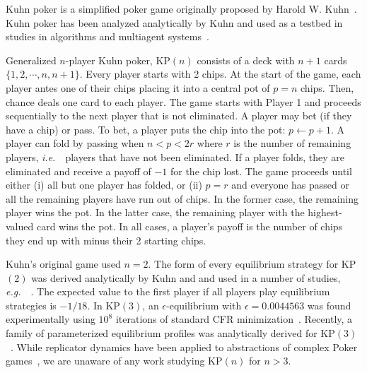 \documentclass{aamas2014}
\newcommand{\ie}{{\it i.e.}~}
\newcommand{\eg}{{\it e.g.}~}
\begin{document}

Kuhn poker is a simplified poker game originally proposed by Harold W. Kuhn~\cite{Kuhn50}. 
Kuhn poker has been analyzed analytically by Kuhn and used as a testbed in studies in 
algorithms and multiagent systems~\cite{hoehn05,AbouRisk10,Szafron13Kuhn}.  

Generalized $n$-player Kuhn poker, KP$(n)$ consists of a deck with $n+1$ cards $\{ 1, 2, \cdots, n, n+1 \}$. 
Every player starts with 2 chips. At the start of the game, each player antes one of their chips placing it
into a central pot of $p = n$ chips. 
Then, chance deals one card to each player.
The game starts with Player 1 and proceeds sequentially to the next player that is not eliminated. 
A player may bet (if they have a chip) or pass. 
To bet, a player puts the chip into the pot: $p \leftarrow p + 1$. 
A player can fold by passing when $n < p < 2r$ where $r$ is the number of remaining players, \ie~players that have not been eliminated. 
If a player folds, they are eliminated and receive a payoff of $-1$ for the chip lost. 
The game proceeds until either (i) all but one player has folded, or (ii) $p = r$ and everyone has passed or all the 
remaining players have run out of chips. 
In the former case, the remaining player wins the pot. In the latter case, the 
remaining player with the highest-valued card wins the pot. In all cases, a player's payoff is the number of chips
they end up with minus their 2 starting chips. 

Kuhn's original game used $n = 2$. The form of every equilibrium strategy for KP$(2)$ was derived analytically
by Kuhn and and used in a number of studies, \eg~\cite{hoehn05}. 
The expected value to the first player if all players play equilibrium strategies is $-1/18$. 
In KP$(3)$, an $\epsilon$-equilibrium with $\epsilon = 0.0044563$ was 
found experimentally using $10^8$ iterations of standard CFR minimization~\cite{AbouRisk10}. 
Recently, a family of parameterized equilibrium profiles was analytically derived for KP$(3)$~\cite{Szafron13Kuhn}.
While replicator dynamics have been applied to abstractions of complex Poker games~\cite{ponsen09b},
we are unaware of any work studying KP$(n)$ for $n > 3$.
\end{document}
